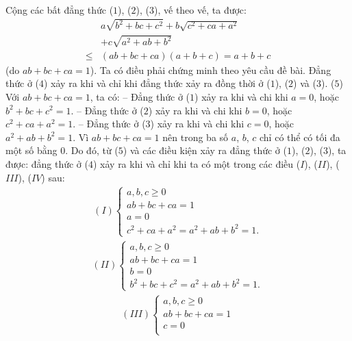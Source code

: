 \begin{multicols}{2}
\begin{align*}
	\end{align*}
	Cộng các bất đẳng thức ($1$), ($2$), ($3$), vế theo vế, ta được:
	\begin{align*}
		&a\sqrt {{b^2} + bc + {c^2}}  + b\sqrt {{c^2} + ca + {a^2}}  \\
		&+ c\sqrt {{a^2} + ab + {b^2}}  \\
		\le &\left( {ab \!+\! bc \!+\! ca} \right)\!\left( {a \!+\! b \!+\! c} \right) \!=\! a \!+\! b \!+\! c \tag{$4$}
	\end{align*}
	(do $ab + bc + ca = 1$).
	\vskip 0.05cm
	Ta có điều phải chứng minh theo yêu cầu đề bài.
	\vskip 0.05cm
	Đẳng thức ở ($4$) xảy ra khi và chỉ khi đẳng thức xảy ra đồng thời ở ($1$), ($2$) và ($3$).                    \hfill ($5$)
	\vskip 0.05cm
	Với $ab + bc + ca = 1$, ta có:
	\vskip 0.05cm
	-- Đẳng thức ở ($1$) xảy ra khi và chi khi $a = 0$, hoặc $b^2 + bc + c^2 = 1$. 
	\vskip 0.05cm 
	-- Đẳng thức ở ($2$) xảy ra khi và chi khi $b = 0$, hoặc  $c^2 + ca + a^2 = 1$.
	\vskip 0.05cm
	-- Đẳng thức ở ($3$) xảy ra khi và chi khi $c = 0$, hoặc  $a^2 + ab + b^2 = 1$.
	\vskip 0.05cm
	Vì $ab + bc + ca = 1$ nên trong ba số $a$, $b$, $c$ chỉ có thể có tối đa một số bằng $0$. Do đó, từ ($5$) và các điều kiện xảy ra đẳng thức ở ($1$), ($2$), ($3$), ta được: đẳng thức ở ($4$) xảy ra khi và chỉ khi ta có một trong các điều ($I$), ($II$), ($III$), ($IV$) sau:
	\begin{align*}
		(I)\begin{cases}
			a,b,c \ge 0\\[-0.5ex]
			ab + bc + ca = 1\\[-0.5ex] 
			a = 0\\[-0.5ex]
			{c^2} + ca + {a^2} = {a^2} + ab + {b^2} = 1.
		\end{cases}
	\end{align*}
	\begin{align*}
		(II)\begin{cases}
			a,b,c \ge 0\\[-0.5ex]
			ab + bc + ca = 1\\[-0.5ex]
			b = 0\\[-0.5ex]
			{b^2} + bc + {c^2} = {a^2} + ab + {b^2} = 1.
		\end{cases}
	\end{align*}
	\begin{align*}
		(III)\begin{cases}
			a,b,c \ge 0\\[-0.5ex]
			ab + bc + ca = 1\\[-0.5ex]
			c = 0\\[-0.5ex]

\end{cases}
\end{align*}
\end{multicols}

